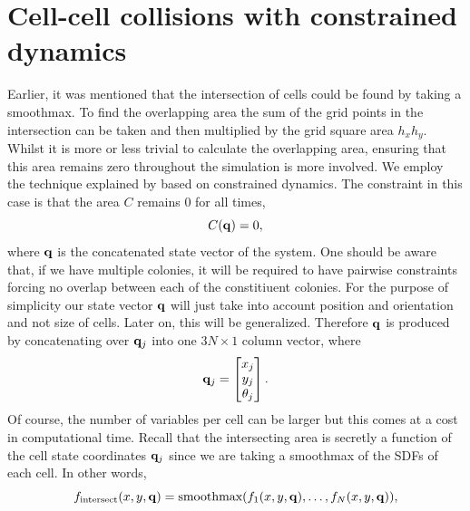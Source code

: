 \section{Cell-cell collisions with constrained dynamics}
Earlier, it was mentioned that the intersection of cells could be found by taking a smoothmax. To find the overlapping area
the sum of the grid points in the intersection can be taken and then multiplied by the grid square area $h_x h_y$. Whilst
it is more or less trivial to calculate the overlapping area, ensuring that this area remains zero throughout the simulation
is more involved. We employ the technique explained by \cite{witkin1997introduction} based on constrained
dynamics. The constraint in this case is that the area $C$ remains $0$ for all times,
\begin{equation}
    C(\vb{q}) = 0,
\end{equation}
where $\vb{q}$ is the concatenated state vector of the system. One should be aware that, if we have multiple colonies, it will
be required to have pairwise constraints forcing no overlap between each of the constitiuent colonies. For the purpose of simplicity
our state vector $\vb{q}$ will just take into account position and orientation and not size of cells. Later on, this will be generalized.
Therefore $\vb{q}$ is produced by concatenating over $\vb{q}_j$ into one $3N \times 1$ column vector, where
\begin{equation}
\vb{q}_j = \begin{bmatrix}
                x_j \\
                y_j \\
                \theta_j
            \end{bmatrix}.
\end{equation}
Of course, the number of variables per cell can be larger but this comes at a cost in computational time. Recall that the 
intersecting area is secretly a function of the cell state coordinates $\vb{q}_j$ since we are taking a smoothmax of the SDFs 
of each cell. In other words,
\begin{equation*}
f_{\textrm{intersect}}(x,y,\vb{q}) = \textrm{smoothmax}(f_1(x,y,\vb{q}) , \ldots, f_N(x,y,\vb{q}) ),
\end{equation*}

